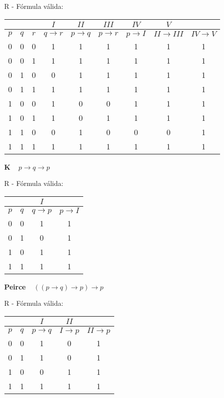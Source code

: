 \documentclass[12pt,a4paper,oneside]{article}
\begin{document}
\begin{enumerate}
\begin{enumerate}
			{\color{verde} R - Fórmula válida:
			\begin{center}
				\begin{tabular}{ccc|c|c|c|c|c|c}
				 &  &  & $I$ & $II$ & $III$ & $IV$ & $V$ &\\
				 \hline
				$p$ & $q$ & $r$ & $q \rightarrow r$ & $p \rightarrow q$ & $p \rightarrow r$ & $p \rightarrow I$ & $II \rightarrow III$ & $IV \rightarrow V$\\ 
				\hline 
				0 & 0 & 0 & 1 & 1 & 1 & 1 & 1 & 1 \\
				0 & 0 & 1 & 1 & 1 & 1 & 1 & 1 & 1 \\  
				0 & 1 & 0 & 0 & 1 & 1 & 1 & 1 & 1 \\  
				0 & 1 & 1 & 1 & 1 & 1 & 1 & 1 & 1 \\  
				1 & 0 & 0 & 1 & 0 & 0 & 1 & 1 & 1 \\ 
				1 & 0 & 1 & 1 & 0 & 1 & 1 & 1 & 1 \\  
				1 & 1 & 0 & 0 & 1 & 0 & 0 & 0 & 1 \\  
				1 & 1 & 1 & 1 & 1 & 1 & 1 & 1 & 1 \\  
				\hline 
				\end{tabular}  
			\end{center} 
			}
			\item[\bf K] \mbox{ } $p \rightarrow q \rightarrow p$
			
			{\color{verde} R - Fórmula válida:
			\begin{center}
				\begin{tabular}{c|c|c|c}
				 &  & $I$ &  \\ 
				\hline 
				$p$ & $q$ & $q \rightarrow p$ & $p \rightarrow I$  \\ 
				\hline 
				0 & 0 & 1 & 1 \\ 
				0 & 1 & 0 & 1 \\ 
				1 & 0 & 1 & 1 \\ 
				1 & 1 & 1 & 1 \\ 
				\hline 
				\end{tabular} 
			\end{center} 
			}
	   \item[\bf Peirce] \mbox{ } $((p \rightarrow q) \rightarrow p) \rightarrow p$
	   
	   {\color{verde} R - Fórmula válida:
			\begin{center}
				\begin{tabular}{c|c|c|c|c}
				 &  & $I$ & $II$ &  \\ 
				\hline 
				$p$ & $q$ & $p \rightarrow q$ & $I \rightarrow p$ & $II \rightarrow p$ \\ 
				\hline 
				0 & 0 & 1 & 0 & 1 \\ 
				0 & 1 & 1 & 0 & 1 \\ 
				1 & 0 & 0 & 1 & 1 \\ 
				1 & 1 & 1 & 1 & 1 \\ 
				\hline 
				\end{tabular} 
			\end{center} 
			}
		\end{enumerate}	
	

\end{enumerate}
\end{document}

